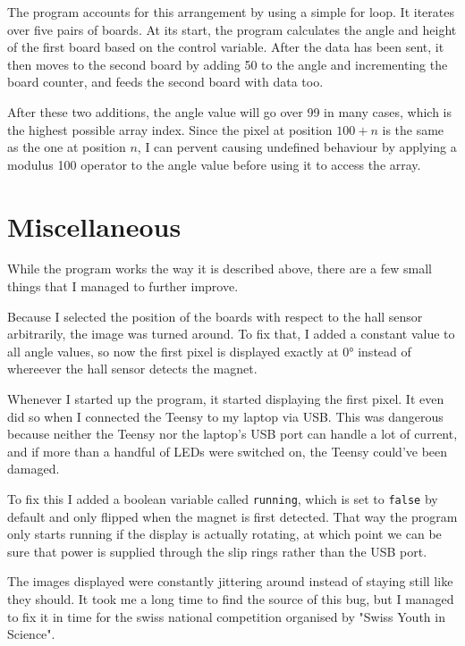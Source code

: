 \documentclass[a4paper, 11pt, titlepage]{report}
\begin{document}
The program accounts for this arrangement by using a simple for loop. It iterates over five pairs
of boards. At its start, the program calculates the angle and height of the first board based on
the control variable. After the data has been sent, it then moves to the second board by adding 50
to the angle and incrementing the board counter, and feeds the second board with data too.

After these two additions, the angle value will go over 99 in many cases, which is the highest
possible array index. Since the pixel at position $100+n$ is the same as the one at position $n$, I
can pervent causing undefined behaviour by applying a modulus 100 operator to the angle value
before using it to access the array.


\section{Miscellaneous}

While the program works the way it is described above, there are a few small things that I managed
to further improve.

Because I selected the position of the boards with respect to the hall sensor arbitrarily, the
image was turned around. To fix that, I added a constant value to all angle values, so now the
first pixel is displayed exactly at 0° instead of whereever the hall sensor detects the magnet.

Whenever I started up the program, it started displaying the first pixel. It even did so when I
connected the Teensy to my laptop via USB. This was dangerous because neither the Teensy nor the
laptop's USB port can handle a lot of current, and if more than a handful of LEDs were switched on,
the Teensy could've been damaged.

To fix this I added a boolean variable called \texttt{running}, which is set to \texttt{false} by
default and only flipped when the magnet is first detected. That way the program only starts
running if the display is actually rotating, at which point we can be sure that power is supplied
through the slip rings rather than the USB port.

The images displayed were constantly jittering around instead of staying still like they should. It
took me a long time to find the source of this bug, but I managed to fix it in time for the swiss
national competition organised by "Swiss Youth in Science".
\end{document}
